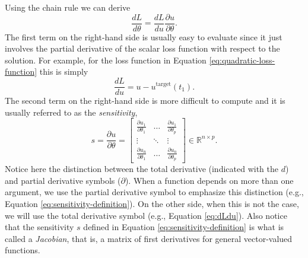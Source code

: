 Using the chain rule we can derive
\begin{equation} 
 \frac{dL}{d\theta} = \frac{dL}{du} \frac{\partial u}{\partial \theta}.
 \label{eq:dLdtheta_VJP}
\end{equation} 
The first term on the right-hand side is usually easy to evaluate since it just involves the partial derivative of the scalar loss function with respect to the solution.
For example, for the loss function in Equation \eqref{eq:quadratic-loss-function} this is simply
\begin{equation}
    \frac{dL}{du} = u - u^{\text{target}}(t_1).
    \label{eq:dLdu}
\end{equation}
The second term on the right-hand side is more difficult to compute and it is usually referred to as the \textit{sensitivity},
\begin{equation}
 s 
 = 
 \frac{\partial u}{\partial \theta} 
 =
 \begin{bmatrix}
   \frac{\partial u_1}{\partial \theta_1} & \dots & \frac{\partial u_1}{\partial \theta_p} \\
   \vdots & \ddots & \vdots \\
   \frac{\partial u_n}{\partial \theta_1} & \dots & \frac{\partial u_n}{\partial \theta_p}
 \end{bmatrix}
 \in \mathbb R^{n \times p}.
 \label{eq:sensitivity-definition}
\end{equation}
Notice here the distinction between the total derivative (indicated with the $d$) and partial derivative symbols ($\partial$). 
When a function depends on more than one argument, we use the partial derivative symbol to emphasize this distinction (e.g., Equation \eqref{eq:sensitivity-definition}). 
On the other side, when this is not the case, we will use the total derivative symbol (e.g., Equation \eqref{eq:dLdu}).
Also notice that the sensitivity $s$ defined in Equation \eqref{eq:sensitivity-definition} is what is called a \textit{Jacobian}, that is, a matrix of first derivatives for general vector-valued functions.

